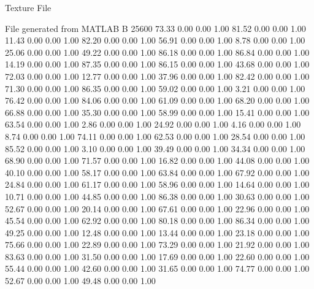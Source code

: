 Texture File

File generated from MATLAB
B 25600
   73.33   0.00   0.00   1.00
   81.52   0.00   0.00   1.00
   11.43   0.00   0.00   1.00
   82.20   0.00   0.00   1.00
   56.91   0.00   0.00   1.00
    8.78   0.00   0.00   1.00
   25.06   0.00   0.00   1.00
   49.22   0.00   0.00   1.00
   86.18   0.00   0.00   1.00
   86.84   0.00   0.00   1.00
   14.19   0.00   0.00   1.00
   87.35   0.00   0.00   1.00
   86.15   0.00   0.00   1.00
   43.68   0.00   0.00   1.00
   72.03   0.00   0.00   1.00
   12.77   0.00   0.00   1.00
   37.96   0.00   0.00   1.00
   82.42   0.00   0.00   1.00
   71.30   0.00   0.00   1.00
   86.35   0.00   0.00   1.00
   59.02   0.00   0.00   1.00
    3.21   0.00   0.00   1.00
   76.42   0.00   0.00   1.00
   84.06   0.00   0.00   1.00
   61.09   0.00   0.00   1.00
   68.20   0.00   0.00   1.00
   66.88   0.00   0.00   1.00
   35.30   0.00   0.00   1.00
   58.99   0.00   0.00   1.00
   15.41   0.00   0.00   1.00
   63.54   0.00   0.00   1.00
    2.86   0.00   0.00   1.00
   24.92   0.00   0.00   1.00
    4.16   0.00   0.00   1.00
    8.74   0.00   0.00   1.00
   74.11   0.00   0.00   1.00
   62.53   0.00   0.00   1.00
   28.54   0.00   0.00   1.00
   85.52   0.00   0.00   1.00
    3.10   0.00   0.00   1.00
   39.49   0.00   0.00   1.00
   34.34   0.00   0.00   1.00
   68.90   0.00   0.00   1.00
   71.57   0.00   0.00   1.00
   16.82   0.00   0.00   1.00
   44.08   0.00   0.00   1.00
   40.10   0.00   0.00   1.00
   58.17   0.00   0.00   1.00
   63.84   0.00   0.00   1.00
   67.92   0.00   0.00   1.00
   24.84   0.00   0.00   1.00
   61.17   0.00   0.00   1.00
   58.96   0.00   0.00   1.00
   14.64   0.00   0.00   1.00
   10.71   0.00   0.00   1.00
   44.85   0.00   0.00   1.00
   86.38   0.00   0.00   1.00
   30.63   0.00   0.00   1.00
   52.67   0.00   0.00   1.00
   20.14   0.00   0.00   1.00
   67.61   0.00   0.00   1.00
   22.96   0.00   0.00   1.00
   45.54   0.00   0.00   1.00
   62.92   0.00   0.00   1.00
   80.18   0.00   0.00   1.00
   86.34   0.00   0.00   1.00
   49.25   0.00   0.00   1.00
   12.48   0.00   0.00   1.00
   13.44   0.00   0.00   1.00
   23.18   0.00   0.00   1.00
   75.66   0.00   0.00   1.00
   22.89   0.00   0.00   1.00
   73.29   0.00   0.00   1.00
   21.92   0.00   0.00   1.00
   83.63   0.00   0.00   1.00
   31.50   0.00   0.00   1.00
   17.69   0.00   0.00   1.00
   22.60   0.00   0.00   1.00
   55.44   0.00   0.00   1.00
   42.60   0.00   0.00   1.00
   31.65   0.00   0.00   1.00
   74.77   0.00   0.00   1.00
   52.67   0.00   0.00   1.00
   49.48   0.00   0.00   1.00
